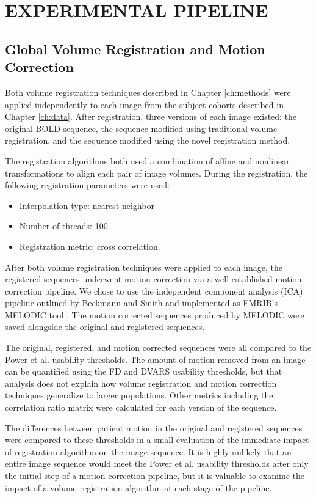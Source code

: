 \chapter{EXPERIMENTAL PIPELINE}
\label{ch:experiments}


\section{Global Volume Registration and Motion Correction}

Both volume registration techniques described in Chapter \ref{ch:methods} were applied independently to each image from the subject cohorts described in Chapter \ref{ch:data}. After registration, three versions of each image existed: the original BOLD sequence, the sequence modified using traditional volume registration, and the sequence modified using the novel registration method.

The registration algorithms both used a combination of affine and nonlinear transformations to align each pair of image volumes. During the registration, the following registration parameters were used:
\begin{itemize}
\item Interpolation type: nearest neighbor
\item Number of threads: 100
\item Registration metric: cross correlation.
\end{itemize}

After both volume registration techniques were applied to each image, the registered sequences underwent motion correction via a well-established motion correction pipeline. We chose to use the independent component analysis (ICA) pipeline outlined by Beckmann and Smith and implemented as FMRIB's MELODIC tool \cite{Beckmann2004}. The motion corrected sequences produced by MELODIC were saved alongside the original and registered sequences. 

The original, registered, and motion corrected sequences were all compared to the Power et al. usability thresholds. The amount of motion removed from an image can be quantified using the FD and DVARS usability thresholds, but that analysis does not explain how volume registration and motion correction techniques generalize to larger populations. Other metrics including the correlation ratio matrix were calculated for each version of the sequence.

The differences between patient motion in the original and registered sequences were compared to these thresholds in a small evaluation of the immediate impact of registration algorithm on the image sequence. It is highly unlikely that an entire image sequence would meet the Power et al. usability thresholds after only the initial step of a motion correction pipeline, but it is valuable to examine the impact of a volume registration algorithm at each stage of the pipeline. 


